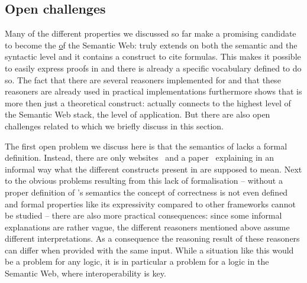 





\subsection{Open challenges}
Many of the different properties we discussed so far make \nthree a promising candidate to become the \ul of the Semantic Web: \nthree truly extends \rdf on both the semantic and the syntactic 
level and it contains a construct to cite formulas. This makes it possible to easily express  proofs in \nthree and there is already a specific vocabulary defined to do so.
The fact that there are several reasoners implemented for \nthree and that these reasoners are already used in practical implementations furthermore shows that \nthreelogic is more then just a theoretical construct: 
\nthree actually connects to the highest level of the Semantic Web stack, 
the level of application. But there are also open challenges related to \nthree which we briefly discuss in this section.

The first open problem we discuss here is that the semantics of \nthree lacks a formal definition. Instead, there are only websites~\cite{Notation3,Notation32} and a paper~\cite{N3Logic} explaining in 
an informal way what the different constructs present in \nthree are supposed to mean. Next to the obvious problems resulting from this lack of formalisation -- without a proper definition of \nthree's semantics 
the concept of correctness is not even defined and formal properties like its expressivity compared to other frameworks %
cannot 
be studied -- there are also more practical consequences: since some informal explanations are rather vague, the different reasoners mentioned above assume different interpretations.  
As a consequence the reasoning result of these reasoners can differ when provided with the same input. While a situation like this would be a problem for any logic, 
it is in particular a problem for a logic in the Semantic Web, where interoperability is key. 

